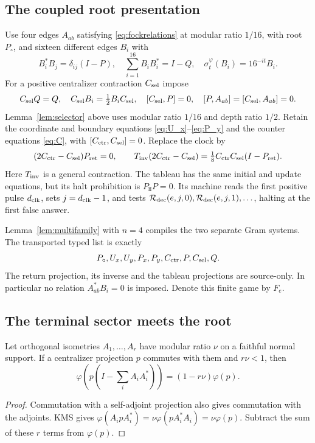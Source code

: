 \subsection{The coupled root presentation}
Use four edges $A_{ab}$ satisfying \eqref{eq:fockrelations} at modular
ratio $1/16$, with root $P_\circ$, and sixteen different edges $B_i$ with
\[
 B_i^*B_j=\delta_{ij}(I-P),\quad \sum_{i=1}^{16}B_iB_i^*=I-Q,
 \quad \sigma_t^\varphi(B_i)=16^{-it}B_i.
\]
For a positive centralizer contraction $C_{\rm sel}$ impose
\[
 C_{\rm sel}Q=Q,\quad C_{\rm sel}B_i=\tfrac12B_iC_{\rm sel},
 \quad[C_{\rm sel},P]=0,\quad[P,A_{ab}]=[C_{\rm sel},A_{ab}]=0.
\]
Lemma~\ref{lem:selector} above uses modular ratio $1/16$ and
depth ratio $1/2$. Retain the coordinate and boundary equations
\eqref{eq:U_x}--\eqref{eq:P_y} and the counter equations
\eqref{eq:C}, with $[C_{\rm ctr},C_{\rm sel}]=0$. Replace the clock by
\begin{equation}\label{eq:equalityreader}
 (2C_{\rm ctr}-C_{\rm sel})P_{\rm ret}=0,\qquad
 T_{\rm inv}(2C_{\rm ctr}-C_{\rm sel})=
 \tfrac18C_{\rm ctr}C_{\rm sel}(I-P_{\rm ret}).
\end{equation}
Here $T_{\rm inv}$ is a general contraction. The tableau has the same
initial and update equations, but its halt prohibition is
$P_{\mathtt H}P=0$. Its machine reads the first positive pulse ${d_{\rm clk}}$, sets
$j={d_{\rm clk}}-1$, and tests $\mathcal R_{\rm dec}(e,j,0),\mathcal R_{\rm dec}(e,j,1),\ldots$, halting at the
first false answer.

Lemma~\ref{lem:multifamily} with $n=4$ compiles the two separate Gram
systems. The transported typed list is exactly
\[
 P_\circ,U_x,U_y,P_x,P_y,C_{\rm ctr},P,C_{\rm sel},Q.
\]
The return projection, its inverse and the tableau projections are
source-only. In particular no relation $A_{ab}^*B_i=0$ is imposed.
Denote this finite game by $F_e$.

\subsection{The terminal sector meets the root}
\begin{lemma}\label{lem:terminalroot}
Let orthogonal isometries $A_1,\ldots,A_r$ have modular ratio
$\nu$ on a faithful normal support. If a centralizer projection $p$
commutes with them and $r\nu<1$, then
\[
 \varphi\left(p\left(I-\sum_i A_iA_i^*\right)\right)
 =(1-r\nu)\varphi(p).
\]
\end{lemma}
\begin{proof}
Commutation with a self-adjoint projection also gives commutation with
the adjoints. KMS gives
$\varphi(A_ipA_i^*)=\nu\varphi(pA_i^*A_i)=\nu\varphi(p)$.
Subtract the sum of these $r$ terms from $\varphi(p)$.
\end{proof}


